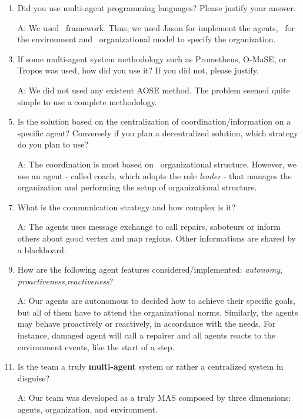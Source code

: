 \begin{enumerate}
\item Did you use multi-agent programming languages? Please justify your answer.
 	\item[A:] We used \jacamo\ framework. Thus, we used Jason for implement the agents, \cartago\ for the environment and \moise\ organizational model to specify the organization. \\
 	
\item If some multi-agent system methodology such as Prometheus, O-MaSE, or Tropos was used, how did you use it? If you did not, please justify.
   	\item[A:] We did not used any existent AOSE method. The problem seemed quite simple to use a complete methodology. \\
   	
\item Is the solution based on the centralization of coordination/information on a specific agent? Conversely if you plan a decentralized solution, which strategy do you plan to use?
 	\item[A:] The coordination is most based on \moise\ organizational structure. However, we use an agent - called coach, which adopts the role \emph{leader} - that manages the organization and performing the setup of organizational structure. \\
 	
\item What is the communication strategy and how complex is it?
 	\item[A:] The agents uses message exchange to call repairs, saboteurs or inform others about good vertex and map regions. Other informations are shared by a blackboard.	\\
 	
\item How are the following agent features considered/implemented: \emph{autonomy}, \emph{proactiveness},\emph{reactiveness}?
 	\item[A:] Our agents are autonomous to decided how to achieve their specific goals, but all of them have to attend the organizational norms. Similarly, the agents may behave proactively or reactively, in accordance with the needs. For instance, damaged agent will call a repairer and all agents reacts to the environment events, like the start of a step.\\
 	 	
\item Is the team a truly \textbf{multi-agent} system or rather a centralized system in disguise?
 	\item[A:] Our team was developed as a truly MAS composed by three dimensions: agents, organization, and  environment.\\
 	 	

\end{enumerate}

